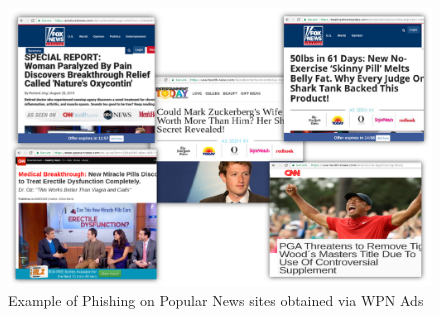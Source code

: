 \begin{figure}
\begin{center}
 \includegraphics[width=\linewidth]{figs/fake_news.pdf}
        \caption{Example of Phishing on Popular News sites obtained via WPN Ads}
        \label{fake_news}
\end{center}
\end{figure}


